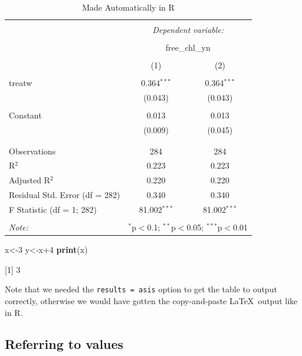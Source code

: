 \documentclass[11pt,]{article}
\newenvironment{Shaded}{\begin{snugshade}}{\end{snugshade}}
\newcommand{\KeywordTok}[1]{\textcolor[rgb]{0.13,0.29,0.53}{\textbf{{#1}}}}
\newcommand{\DecValTok}[1]{\textcolor[rgb]{0.00,0.00,0.81}{{#1}}}
\newcommand{\NormalTok}[1]{{#1}}
\begin{document}
\begin{table}[!htbp] \centering 
  \caption{Made Automatically in R} 
  \label{} 
\begin{tabular}{@{\extracolsep{5pt}}lcc} 
\\[-1.8ex]\hline 
\hline \\[-1.8ex] 
 & \multicolumn{2}{c}{\textit{Dependent variable:}} \\ 
\cline{2-3} 
\\[-1.8ex] & \multicolumn{2}{c}{free\_chl\_yn} \\ 
\\[-1.8ex] & (1) & (2)\\ 
\hline \\[-1.8ex] 
 treatw & 0.364$^{***}$ & 0.364$^{***}$ \\ 
  & (0.043) & (0.043) \\ 
  & & \\ 
 Constant & 0.013 & 0.013 \\ 
  & (0.009) & (0.045) \\ 
  & & \\ 
\hline \\[-1.8ex] 
Observations & 284 & 284 \\ 
R$^{2}$ & 0.223 & 0.223 \\ 
Adjusted R$^{2}$ & 0.220 & 0.220 \\ 
Residual Std. Error (df = 282) & 0.340 & 0.340 \\ 
F Statistic (df = 1; 282) & 81.002$^{***}$ & 81.002$^{***}$ \\ 
\hline 
\hline \\[-1.8ex] 
\textit{Note:}  & \multicolumn{2}{r}{$^{*}$p$<$0.1; $^{**}$p$<$0.05; $^{***}$p$<$0.01} \\ 
\end{tabular} 
\end{table}

\begin{Shaded}
\begin{Highlighting}[]
\NormalTok{x<-}\DecValTok{3}
\NormalTok{y<-x}\DecValTok{+4}
\KeywordTok{print}\NormalTok{(x)}
\end{Highlighting}
\end{Shaded}

{[}1{]} 3

Note that we needed the
\texttt{results\ =\ \textquotesingle{}asis\textquotesingle{}} option to
get the table to output correctly, otherwise we would have gotten the
copy-and-paste \LaTeX~output like in R.

\subsection{Referring to values}\label{referring-to-values}
\end{document}
